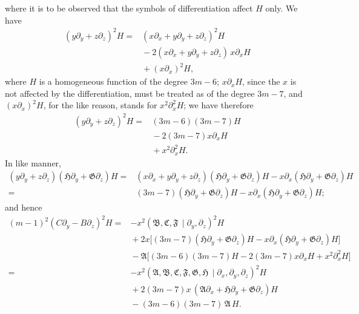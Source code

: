 \documentclass[11pt]{article}
\newcommand{\Cdel}{\mid}
\begin{document}
\noindent where it is to be observed that the symbols of differentiation affect $H$ only. We have
\[
\begin{aligned}
(y\partial_y + z\partial_z)^2 H ={}& (x\partial_x + y\partial_y + z\partial_z)^2 H\\
&{}- 2(x\partial_x + y\partial_y + z\partial_z)\,x\partial_x H\\
&{}+ (x\partial_x)^2 H,
\end{aligned}
\]
where $H$ is a homogeneous function of the degree $3m - 6$; $x\partial_x H$, since the $x$ is not affected by the differentiation, must be treated as of the degree $3m - 7$, and $(x\partial_x)^2 H$, for the like reason, stands for $x^2\partial_x^2 H$; we have therefore
\[
\begin{aligned}
(y\partial_y + z\partial_z)^2 H ={}& (3m-6)(3m-7)H\\
&{}- 2(3m-7)x\partial_x H\\
&{}+ x^2\partial_x^2 H.
\end{aligned}
\]
In like manner,
\[
\begin{aligned}
(y\partial_y + z\partial_z)(\mathfrak{H}\partial_y + \mathfrak{G}\partial_z)H ={}& (x\partial_x + y\partial_y + z\partial_z)(\mathfrak{H}\partial_y + \mathfrak{G}\partial_z)H - x\partial_x(\mathfrak{H}\partial_y + \mathfrak{G}\partial_z)H\\
={}& (3m-7)(\mathfrak{H}\partial_y + \mathfrak{G}\partial_z)H - x\partial_x(\mathfrak{H}\partial_y + \mathfrak{G}\partial_z)H;
\end{aligned}
\]
and hence
\[
\begin{aligned}
(m-1)^2(C\partial_y - B\partial_z)^2 H ={}& -x^2(\mathfrak{B}, \mathfrak{C}, \mathfrak{F}\,\Cdel\partial_y, \partial_z)^2 H\\
&{}+ 2x\bigl[(3m-7)(\mathfrak{H}\partial_y + \mathfrak{G}\partial_z)H - x\partial_x(\mathfrak{H}\partial_y + \mathfrak{G}\partial_z)H\bigr]\\
&{}- \mathfrak{A}\bigl[(3m-6)(3m-7)H - 2(3m-7)x\partial_x H + x^2\partial_x^2 H\bigr]\\
={}& -x^2(\mathfrak{A}, \mathfrak{B}, \mathfrak{C}, \mathfrak{F}, \mathfrak{G}, \mathfrak{H}\,\Cdel\partial_x, \partial_y, \partial_z)^2 H\\
&{}+ 2(3m-7)x\,(\mathfrak{A}\partial_x + \mathfrak{H}\partial_y + \mathfrak{G}\partial_z)H\\
&{}- (3m-6)(3m-7)\,\mathfrak{A}\,H.
\end{aligned}
\]

\medskip
\end{document}
